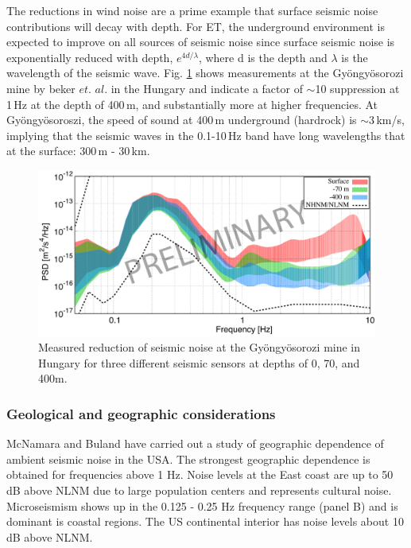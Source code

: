 The reductions in wind noise are a prime example that surface seismic noise contributions will decay with depth. For ET, the underground environment is expected to improve on all sources of seismic noise since surface seismic noise is exponentially reduced with depth, $e^{4d /\lambda}$, where d is the depth and $\lambda$ is the wavelength of the seismic wave. Fig. \ref{fig3.6} shows measurements at the Gy\"ongy\"osorozi mine by beker $et$. $al$. in the Hungary and indicate a factor of $\sim$10 suppression at 1\,Hz at the depth of 400\,m, and substantially more at higher frequencies. At Gy\"ongy\"osoroszi, the speed of sound at 400\,m underground (hardrock) is $\sim$3\,km/s, implying that the seismic waves in the 0.1-10\,Hz band have long wavelengths that at the surface: 300\,m - 30\,km.
\begin{figure}[h!]
	\begin{center}
		 \includegraphics[width=15cm]{./Sec_SiteInfra/Figures/Hung_transparent2.pdf}
		\caption{Measured reduction of seismic noise at the Gy\"ongy\"osorozi mine in Hungary for three different seismic sensors at depths of 0, 70, and 400m.}
		\label{fig3.6}
	\end{center}
\end{figure}

\FloatBarrier
\subsubsection{Geological and geographic considerations}

McNamara and Buland \cite{mcnamarab} have carried out a study of geographic dependence of ambient seismic noise in the USA. The strongest geographic dependence is obtained for frequencies above 1 Hz. Noise levels at the East coast are up to 50 dB above NLNM due to large population centers and represents cultural noise. Microseismism shows up in the 0.125 - 0.25 Hz frequency range (panel B) and is dominant is coastal regions. The US continental interior has noise levels about 10 dB above NLNM.

